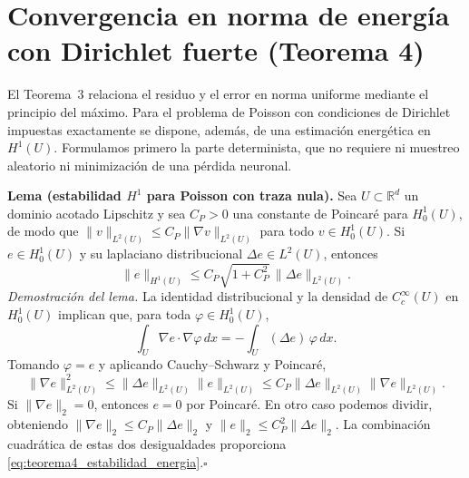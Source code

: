 \section{Convergencia en norma de energía con Dirichlet fuerte (Teorema 4)}
\label{sec:teorema4_dirichlet_fuerte}

El Teorema~3 relaciona el residuo y el error en norma uniforme mediante el
principio del máximo. Para el problema de Poisson con condiciones de Dirichlet
impuestas exactamente se dispone, además, de una estimación energética en
$H^1(U)$. Formulamos primero la parte determinista, que no requiere ni
muestreo aleatorio ni minimización de una pérdida neuronal.

\medskip
\noindent\textbf{Lema (estabilidad $H^1$ para Poisson con traza nula).}
Sea $U\subset\mathbb R^d$ un dominio acotado Lipschitz y sea $C_P>0$ una
constante de Poincaré para $H_0^1(U)$, de modo que
$\|v\|_{L^2(U)}\le C_P\|\nabla v\|_{L^2(U)}$ para todo
$v\in H_0^1(U)$. Si $e\in H_0^1(U)$ y su laplaciano distribucional
$\Delta e\in L^2(U)$, entonces
\begin{equation}\label{eq:teorema4_estabilidad_energia}
\boxed{\quad
\|e\|_{H^1(U)}\le C_P\sqrt{1+C_P^2}\,
\|\Delta e\|_{L^2(U)}.\quad}
\end{equation}
\noindent\emph{Demostración del lema.}
La identidad distribucional y la densidad de $C_c^\infty(U)$ en
$H_0^1(U)$ implican que, para toda $\varphi\in H_0^1(U)$,
\[
\int_U\nabla e\cdot\nabla\varphi\,dx
=-\int_U(\Delta e)\,\varphi\,dx.
\]
Tomando $\varphi=e$ y aplicando Cauchy--Schwarz y Poincaré,
\[
\|\nabla e\|_{L^2(U)}^2
\le\|\Delta e\|_{L^2(U)}\|e\|_{L^2(U)}
\le C_P\|\Delta e\|_{L^2(U)}\|\nabla e\|_{L^2(U)}.
\]
Si $\|\nabla e\|_2=0$, entonces $e=0$ por Poincaré. En otro caso
podemos dividir, obteniendo
$\|\nabla e\|_2\le C_P\|\Delta e\|_2$ y
$\|e\|_2\le C_P^2\|\Delta e\|_2$. La combinación cuadrática de
estas dos desigualdades proporciona
\eqref{eq:teorema4_estabilidad_energia}.\hfill$\square$


